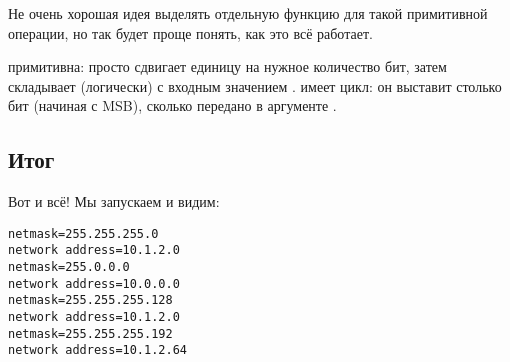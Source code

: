 Не очень хорошая идея выделять отдельную функцию для такой примитивной операции, но так будет проще понять,
как это всё работает.



 примитивна: просто сдвигает единицу на нужное количество бит, затем складывает (логически) с
входным значением .
 имеет цикл: он выставит столько бит (начиная с \ac{MSB}), 
сколько передано в аргументе .

\subsection{Итог}

Вот и всё!
Мы запускаем и видим:

\begin{lstlisting}
netmask=255.255.255.0
network address=10.1.2.0
netmask=255.0.0.0
network address=10.0.0.0
netmask=255.255.255.128
network address=10.1.2.0
netmask=255.255.255.192
network address=10.1.2.64
\end{lstlisting}
